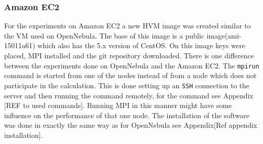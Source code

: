 \subsubsection{Amazon EC2}
For the experiments on Amazon EC2 a new HVM image was created similar to the VM used on OpenNebula. The base of this image is  a public image(ami-15011a61) which also has the 5.x version of CentOS. On this image keys were placed, MPI installed and the git repository downloaded. There is one difference between the experiments done on OpenNebula and the Amazon EC2. The \texttt{mpirun} command is started from one of the nodes instead of from a node which does not participate in the calculation. This is done setting up an \texttt{SSH} connection to the server and then running the command remotely, for the command see Appendix [REF to used commands]. Running MPI in this manner might have some influence on the performance of that one node. The installation of the software was done in exactly the same way as for OpenNebula see Appendix[Ref appendix installation].

